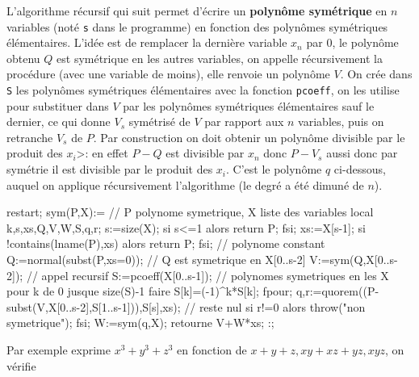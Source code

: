\documentclass[a4paper,11pt]{article}
\begin{document}
\begin{giacjshere}
L'algorithme r\'ecursif qui suit permet d'\'ecrire un {\bf polyn\^ome
sym\'etrique}
en $n$ variables (not\'e \verb|s| dans le programme)
en fonction des polyn\^omes sym\'etriques \'el\'ementaires. L'id\'ee
est de remplacer la derni\`ere variable $x_n$ par 0, le polyn\^ome
obtenu $Q$ est sym\'etrique en les autres variables, on appelle
r\'ecursivement la proc\'edure (avec une variable de moins),
elle renvoie un polyn\^ome
$V$. On cr\'ee dans \verb|S| les polyn\^omes sym\'etriques
\'el\'ementaires avec la fonction \verb|pcoeff|, on les utilise
pour substituer
dans $V$ par les polyn\^omes sym\'etriques \'el\'ementaires sauf
le dernier, ce qui donne $V_s$ sym\'etris\'e de $V$ par rapport aux
$n$ variables, puis on retranche $V_s$ de $P$. Par construction on doit 
obtenir un polyn\^ome divisible par le produit des $x_i$>: en effet
$P-Q$ est divisible par $x_n$ donc $P-V_s$ aussi donc par sym\'etrie
il est divisible par le produit des $x_i$. C'est le polyn\^ome
$q$ ci-dessous, auquel on applique r\'ecursivement l'algorithme
(le degr\'e a \'et\'e dimun\'e de $n$).
\begin{giacprog}
restart;
sym(P,X):={ // P polynome symetrique, X liste des variables
  local k,s,xs,Q,V,W,S,q,r;
  s:=size(X);
  si s<=1 alors return P; fsi;
  xs:=X[s-1];
  si !contains(lname(P),xs) alors return P; fsi; // polynome constant
  Q:=normal(subst(P,xs=0)); // Q est symetrique en X[0..s-2]
  V:=sym(Q,X[0..s-2]); // appel recursif
  S:=pcoeff(X[0..s-1]); // polynomes symetriques en les X
  pour k de 0 jusque size(S)-1 faire S[k]=(-1)^k*S[k]; fpour;
  q,r:=quorem((P-subst(V,X[0..s-2],S[1..s-1])),S[s],xs); // reste nul
  si r!=0 alors throw("non symetrique"); fsi;
  W:=sym(q,X);
  retourne V+W*xs;
}:;
\end{giacprog}
Par exemple
exprime $x^3+y^3+z^3$ en fonction de $x+y+z,xy+xz+yz,xyz$,
on v\'erifie 

\pagebreak


\end{giacjshere}
\end{document}
